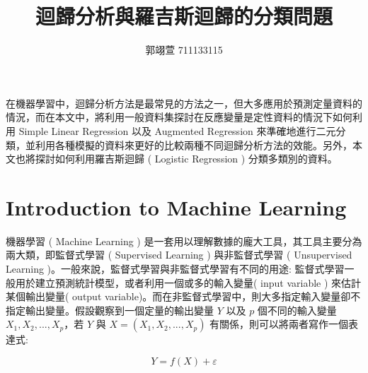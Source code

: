 \geometry{a4paper,left=2.5cm,right=2.5cm,top=2cm,bottom=2cm}
\usepackage{fancyhdr}
\pagestyle{fancy}


\title{{\MB 迴歸分析與羅吉斯迴歸的分類問題}}	
\author{{\BB 郭翊萱 711133115}}				
\date{{ }} 			
 

\maketitle
\fontsize{12}{22pt}\selectfont 



在機器學習中，迴歸分析方法是最常見的方法之一，但大多應用於預測定量資料的情況，而在本文中，將利用一般資料集探討在反應變量是定性資料的情況下如何利用 Simple Linear Regression 以及 Augmented Regression 來準確地進行二元分類，並利用各種模擬的資料來更好的比較兩種不同迴歸分析方法的效能。另外，本文也將探討如何利用羅吉斯迴歸 ( Logistic Regression ) 分類多類別的資料。

\section{Introduction to Machine Learning}

機器學習 ( Machine Learning ) 是一套用以理解數據的龐大工具，其工具主要分為兩大類，即監督式學習 ( Supervised Learning ) 與非監督式學習 ( Unsupervised Learning )。一般來說，監督式學習與非監督式學習有不同的用途: 監督式學習一般用於建立預測統計模型，或者利用一個或多的輸入變量( input variable ) 來估計某個輸出變量( output variable)。而在非監督式學習中，則大多指定輸入變量卻不指定輸出變量。假設觀察到一個定量的輸出變量 $Y$ 以及 $p$ 個不同的輸入變量 $X_1, X_2,...,X_p$，若 $Y$ 與 $X = (X_1, X_2,...,X_p)$ 有關係，則可以將兩者寫作一個表達式:

\begin{equation}
Y =f(X) + \varepsilon
\end{equation}

